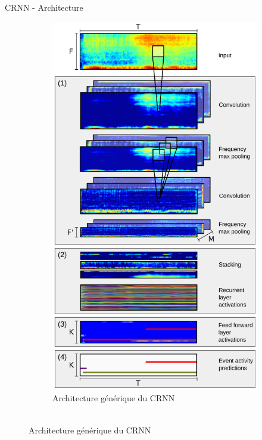 \documentclass[compress,xcolor=table]{beamer}
\begin{document}
\begin{frame}{CRNN - Architecture}

    \begin{figure}[ht]
        \centering
        \begin{subfigure}[b]{0.45\textwidth}
            \centering
            \includegraphics[width=\textwidth,height=0.8\textheight,keepaspectratio]{../images/models/CRNN.architecture.generic.pdf}
            \caption{Architecture générique du CRNN\\~}

\end{subfigure}
\end{figure}
\end{frame}
\end{document}

